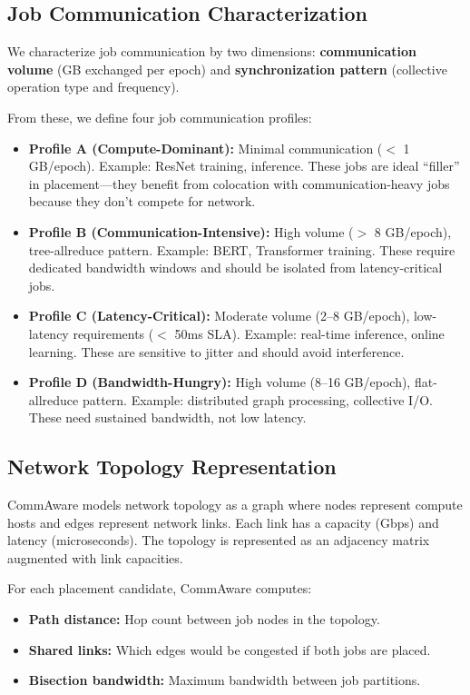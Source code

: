 \documentclass[conference]{IEEEtran}
\begin{document}
\subsection{Job Communication Characterization}

We characterize job communication by two dimensions: \textbf{communication volume} (GB exchanged per epoch) and \textbf{synchronization pattern} (collective operation type and frequency).

From these, we define four job communication profiles:

\begin{itemize}
\item \textbf{Profile A (Compute-Dominant):} Minimal communication ($<$ 1 GB/epoch). Example: ResNet training, inference. These jobs are ideal ``filler'' in placement---they benefit from colocation with communication-heavy jobs because they don't compete for network.

\item \textbf{Profile B (Communication-Intensive):} High volume ($>$ 8 GB/epoch), tree-allreduce pattern. Example: BERT, Transformer training. These require dedicated bandwidth windows and should be isolated from latency-critical jobs.

\item \textbf{Profile C (Latency-Critical):} Moderate volume (2--8 GB/epoch), low-latency requirements ($<$ 50ms SLA). Example: real-time inference, online learning. These are sensitive to jitter and should avoid interference.

\item \textbf{Profile D (Bandwidth-Hungry):} High volume (8--16 GB/epoch), flat-allreduce pattern. Example: distributed graph processing, collective I/O. These need sustained bandwidth, not low latency.
\end{itemize}

\subsection{Network Topology Representation}

CommAware models network topology as a graph where nodes represent compute hosts and edges represent network links. Each link has a capacity (Gbps) and latency (microseconds). The topology is represented as an adjacency matrix augmented with link capacities.

For each placement candidate, CommAware computes:

\begin{itemize}
\item \textbf{Path distance:} Hop count between job nodes in the topology.
\item \textbf{Shared links:} Which edges would be congested if both jobs are placed.
\item \textbf{Bisection bandwidth:} Maximum bandwidth between job partitions.
\end{itemize}
\end{document}
